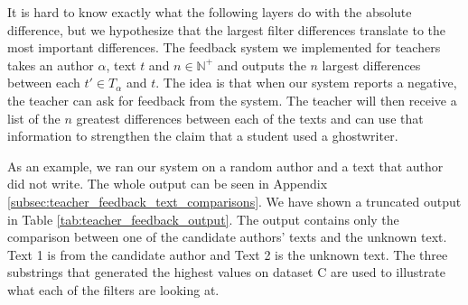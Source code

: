 It is hard to know exactly what the following layers do with the absolute
difference, but we hypothesize that the largest filter differences translate to
the most important differences. The feedback system we implemented for teachers
takes an author $\alpha$, text $t$ and $n \in \mathbb{N}^+$ and outputs the $n$
largest differences between each $t' \in T_\alpha$ and $t$. The idea is that
when our system reports a negative, the teacher can ask for feedback from the
system. The teacher will then receive a list of the $n$ greatest differences
between each of the texts and can use that information to strengthen the claim
that a student used a ghostwriter.

As an example, we ran our system on a random author and a text 
that author did not write. The whole output can be seen in Appendix
\ref{subsec:teacher_feedback_text_comparisons}. We have shown a truncated
output in Table \ref{tab:teacher_feedback_output}. The output contains only
the comparison between one of the candidate authors' texts and the unknown
text. Text 1 is from the candidate author and Text 2 is the unknown text. 
The three substrings that generated the highest values on dataset \gls{C}
are used to illustrate what each of the filters are looking at.

